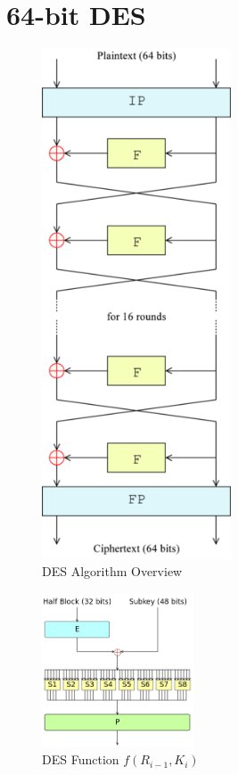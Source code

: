 \section{64-bit DES}

\begin{figure}[ht]
\begin{center}
\includegraphics[width=0.5\textwidth]{./DESAlgo}
\end{center}
\caption{DES Algorithm Overview}
\end{figure}

\begin{figure}[ht]
\begin{center}
\includegraphics[width=0.4\textwidth]{./FFfunc}
\end{center}
\caption{DES Function $f(R_{i-1},K_i)$}
\end{figure}

